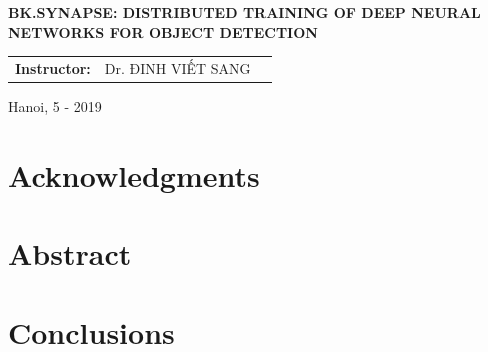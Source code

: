 \documentclass[a4paper,12pt]{report}
\begin{document}
\begin{center}
    {\fontsize{14}{18}\selectfont \textbf{BK.SYNAPSE: DISTRIBUTED TRAINING OF DEEP NEURAL NETWORKS FOR OBJECT DETECTION} }\\[0.9cm]
    
    \begin{table}[ht]
    \centering
    \label{my-label}
    \begin{tabular}{lll}
                   
    \textbf{Instructor:} & Dr. ĐINH VIẾT SANG\\
    
    \end{tabular}
    \end{table} 
    \vspace{4cm}
    \fontsize{12}{19}\selectfont Hanoi, 5 - 2019
\end{center}
\pagebreak

\fontsize {13pt}{16pt}
\selectfont

\chapter*{Acknowledgments}

\pagebreak

\chapter*{Abstract}

\pagebreak

\tableofcontents
\pagebreak






\chapter{Conclusions}

\pagebreak


\end{document}
